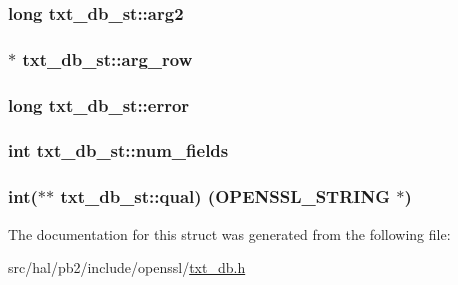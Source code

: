 \subsubsection[{\texorpdfstring{arg2}{arg2}}]{\setlength{\rightskip}{0pt plus 5cm}long txt\+\_\+db\+\_\+st\+::arg2}\hypertarget{structtxt__db__st_ae99864667eb99fd2d18fc91293df6249}{}\label{structtxt__db__st_ae99864667eb99fd2d18fc91293df6249}
\subsubsection[{\texorpdfstring{arg\+\_\+row}{arg_row}}]{$\ast$ txt\+\_\+db\+\_\+st\+::arg\+\_\+row}\hypertarget{structtxt__db__st_a67601c6116a02bdb8ca45dc529da3255}{}\label{structtxt__db__st_a67601c6116a02bdb8ca45dc529da3255}
\subsubsection[{\texorpdfstring{error}{error}}]{\setlength{\rightskip}{0pt plus 5cm}long txt\+\_\+db\+\_\+st\+::error}\hypertarget{structtxt__db__st_addce5883079df416612638f30157ba9d}{}\label{structtxt__db__st_addce5883079df416612638f30157ba9d}
\subsubsection[{\texorpdfstring{num\+\_\+fields}{num_fields}}]{\setlength{\rightskip}{0pt plus 5cm}int txt\+\_\+db\+\_\+st\+::num\+\_\+fields}\hypertarget{structtxt__db__st_ac5e40d76de4af9e3eb8126c5c71f35ee}{}\label{structtxt__db__st_ac5e40d76de4af9e3eb8126c5c71f35ee}
\subsubsection[{\texorpdfstring{qual}{qual}}]{\setlength{\rightskip}{0pt plus 5cm}int($\ast$$\ast$ txt\+\_\+db\+\_\+st\+::qual) ({\bf O\+P\+E\+N\+S\+S\+L\+\_\+\+S\+T\+R\+I\+NG} $\ast$)}\hypertarget{structtxt__db__st_af87dc62965306c802fc5d25b33eb0ffd}{}\label{structtxt__db__st_af87dc62965306c802fc5d25b33eb0ffd}


The documentation for this struct was generated from the following file\+:\begin{DoxyCompactItemize}
\item 
src/hal/pb2/include/openssl/\hyperlink{txt__db_8h}{txt\+\_\+db.\+h}\end{DoxyCompactItemize}
